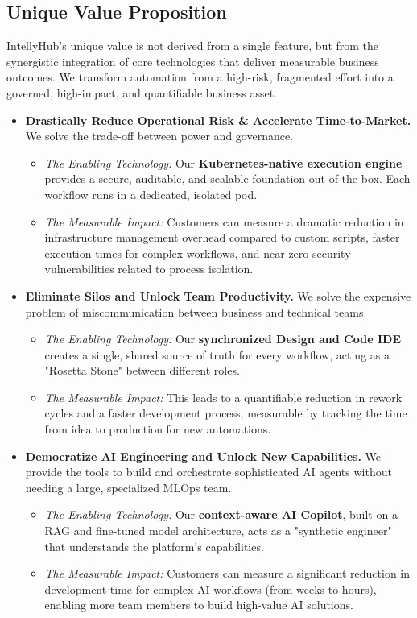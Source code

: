 \subsection{Unique Value Proposition}
IntellyHub's unique value is not derived from a single feature, but from the synergistic integration of core technologies that deliver measurable business outcomes. We transform automation from a high-risk, fragmented effort into a governed, high-impact, and quantifiable business asset.

\begin{itemize}
    \item \textbf{Drastically Reduce Operational Risk \& Accelerate Time-to-Market.} We solve the trade-off between power and governance.
    \begin{itemize}
        \item \textit{The Enabling Technology:} Our \textbf{Kubernetes-native execution engine} provides a secure, auditable, and scalable foundation out-of-the-box. Each workflow runs in a dedicated, isolated pod.
        \item \textit{The Measurable Impact:} Customers can measure a dramatic reduction in infrastructure management overhead compared to custom scripts, faster execution times for complex workflows, and near-zero security vulnerabilities related to process isolation.
    \end{itemize}

    \item \textbf{Eliminate Silos and Unlock Team Productivity.} We solve the expensive problem of miscommunication between business and technical teams.
    \begin{itemize}
        \item \textit{The Enabling Technology:} Our \textbf{synchronized Design and Code IDE} creates a single, shared source of truth for every workflow, acting as a "Rosetta Stone" between different roles.
        \item \textit{The Measurable Impact:} This leads to a quantifiable reduction in rework cycles and a faster development process, measurable by tracking the time from idea to production for new automations.
    \end{itemize}

    \item \textbf{Democratize AI Engineering and Unlock New Capabilities.} We provide the tools to build and orchestrate sophisticated AI agents without needing a large, specialized MLOps team.
    \begin{itemize}
        \item \textit{The Enabling Technology:} Our \textbf{context-aware AI Copilot}, built on a RAG and fine-tuned model architecture, acts as a "synthetic engineer" that understands the platform's capabilities.
        \item \textit{The Measurable Impact:} Customers can measure a significant reduction in development time for complex AI workflows (from weeks to hours), enabling more team members to build high-value AI solutions.
    \end{itemize}
    

\end{itemize}
